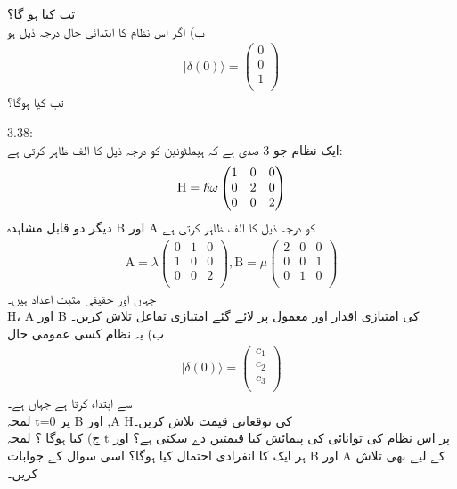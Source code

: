 تب
  کیا ہو گا؟\\
ب) اگر اس نظام کا ابتدائی حال درجہ ذيل ہو
\begin{align}| \delta(0)\rangle =\begin{pmatrix}
0\\
0\\
1\\
\end{pmatrix}\end{align}
تب
  کیا ہوگا؟\\

 3.38:\\
ایک نظام جو 3 صدی ہے کہ ہيملٹونین کو درجہ ذیل کا الف ظاہر کرتی ہے:\\
\begin{align}\text{\text{H}}=\hslash\omega\begin{pmatrix}
1&0&0\\
0&2&0\\
0&0&2\\
\end{pmatrix}\end{align}
دیگر دو قابل مشاہدہ B اور A کو درجہ ذيل کا الف ظاہر کرتی ہے\\
\begin{align}\text{A}=\lambda\begin{pmatrix}
0&1&0\\
1&0&0\\
0&0&2\\
\end{pmatrix} , \text{B}=\mu\begin{pmatrix}
2&0&0\\
0&0&1\\
0&1&0\\
\end{pmatrix}
\end{align}
جہاں
اور
حقیقی مثبت اعداد ہیں۔\\
H، A
اور
B
 کی امتیازی اقدار اور معمول پر لائے  گئے امتیازی تفاعل تلاش کریں۔ \\
ب) یہ نظام کسی عمومی حال
\begin{align}| \delta(0)  \rangle=\begin{pmatrix}
c_{1}\\
c_{2}\\
c_{3}\\
\end{pmatrix}\end{align}
سے ابتداء کرتا ہے جہاں
ہے۔\\
لمحہ t=0 پر B اور ,A Hکی توقعاتی قیمت تلاش كريں۔\\
ج)
کیا ہوگا ؟
لمحہ t پر اس نظام کی توانائی کی پیمائش کیا قيمتيں دے سکتی ہے؟ اور ہر ایک کا انفرادى احتمال کیا ہوگا؟ اسی سوال کے جوابات B اور A کے لیے بھی تلاش كریں۔

